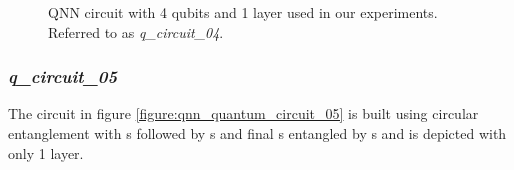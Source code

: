 \begin{figure}[!h]
	\centering
	\caption{QNN circuit with 4 qubits and 1 layer used in our experiments. Referred to as \textit{q\_circuit\_04}.}
	\label{figure:qnn_quantum_circuit_04}
\end{figure}

\subsubsection{\textit{q\_circuit\_05}}
\label{subsubsection:qnn_quantum_circuit_05}
The circuit in figure \ref{figure:qnn_quantum_circuit_05} is built using circular entanglement with \rxgate s followed by \rygate s and final \rzgate s entangled by \cxgate s and is depicted with only 1 layer.

